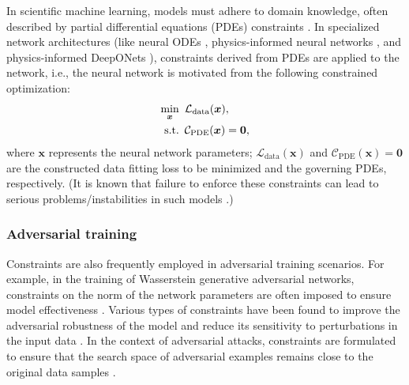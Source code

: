 \documentclass[aos]{imsart}
\numberwithin{equation}{section}
\theoremstyle{plain}
\begin{document}
In scientific machine learning, models must adhere to domain knowledge, often described by partial differential equations (PDEs) constraints \cite{failure21_TR,Cuomo2022Scientific,differentiable_hard_22_TR,learnConservation1_TR}. 
In specialized network architectures (like neural ODEs \cite{chen2018neural}, physics-informed neural networks \cite{raissi2019physics, karniadakis2021physics, failure21_TR}, and physics-informed DeepONets \cite{wang2021learning}), constraints derived from PDEs are applied to the network, i.e., the neural network is motivated from the following constrained optimization:
\begin{equation*}
    \begin{split}
        \min_{\bm{x}} & \hspace{0.5em} \mathcal{L}_{\text{data}}(\bm{x}), \\
        \text{s.t.} & \hspace{0.5em} \mathcal{C}_{\text{PDE}}(\bm{x}) = \bm{0},
    \end{split}
\end{equation*}
where $\bm{x}$ represents the neural network parameters; $\mathcal{L}_{\text{data}}(\bm{x})$ and $\mathcal{C}_{\text{PDE}}(\bm{x}) = \bm{0}$ are the constructed data fitting loss to be minimized and the governing PDEs, respectively. 
(It is known that failure to enforce these constraints can lead to serious problems/instabilities in such models \cite{failure21_TR,differentiable_hard_22_TR,learnConservation1_TR}.)


\subsubsection{Adversarial training}
Constraints are also frequently employed in adversarial training scenarios. 
For example, in the training of Wasserstein generative adversarial networks, constraints on the norm of the network parameters are often imposed to ensure model effectiveness \cite{arjovsky2017wasserstein}. Various types of constraints have been found to improve the adversarial robustness of the model and reduce its sensitivity to perturbations in the input data \cite{cisse2017parseval}. In the context of adversarial attacks, constraints are formulated to ensure that the search space of adversarial examples remains close to the original data samples \cite{goodfellow2014explaining, su2019one, zhu2023adversarial}.
\end{document}
